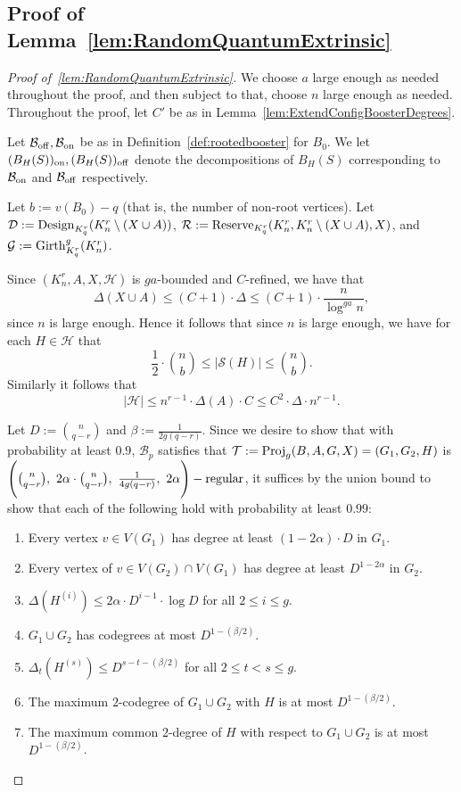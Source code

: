 \documentclass[11pt]{article}
\newcommand{\mc}[1]{\mathcal{#1}}
\newcounter{i}
\theoremstyle{plain}
\renewcommand{\theclaim}{\thetheorem.\arabic{claim}}
\newenvironment{lateproof}[1]
 {%
  \renewcommand{\theclaim}{\ref{#1}.\arabic{claim}}%
  \begin{proof}[Proof of~\cref{#1}]%
 }
 {\end{proof}}
\theoremstyle{plain} %
\theoremstyle{definition}
\newcommand{\LP}[1]{\textcolor{Red}{ $\blacktriangleright$\ {\sf LP: #1}\
  $\blacktriangleleft$ }}
\begin{document}
\subsection{Proof of Lemma~\ref{lem:RandomQuantumExtrinsic}}

\begin{lateproof}{lem:RandomQuantumExtrinsic}
We choose $a$ large enough as needed throughout the proof, and then subject to that, choose $n$ large enough as needed. Throughout the proof, let $C'$ be as in Lemma~\ref{lem:ExtendConfigBoosterDegrees}.

Let $\mathcal{B}_{{\rm off}}, \mathcal{B}_{{\rm on}}$ be as in Definition~\ref{def:rootedbooster} for $B_0$. We let $(B_H(S))_{\rm on}, (B_H(S))_{\rm off}$ denote the decompositions of $B_H(S)$ corresponding to $\mathcal{B}_{\rm on}$ and $\mathcal{B}_{\rm off}$ respectively. 

Let $b:= v(B_0)-q$ (that is, the number of non-root vertices). Let $\mc{D}:= {\rm Design}_{K_q^r}(K_n^r\setminus (X\cup A))$, $\mc{R}:= {\rm Reserve}_{K_q^r}(K_n^r, K_n^r\setminus (X\cup A), X)$, and $\mc{G}:= {\rm Girth}_{K_q^r}^g(K_n^r)$. 

Since $(K_n^r,A,X,\mc{H})$ is $ga$-bounded and $C$-refined, we have that $$\Delta(X\cup A)\le (C+1)\cdot \Delta \le (C+1)\cdot \frac{n}{\log^{ga} n},$$
since $n$ is large enough. Hence it follows that since $n$ is large enough, we have for each $H\in \mc{H}$ that
$$\frac{1}{2}\cdot \binom{n}{b} \le |\mathcal{S}(H)| \le \binom{n}{b}.$$ %
Similarly it follows that $$|\mathcal{H}| \le n^{r-1}\cdot \Delta(A) \cdot C \le C^2\cdot \Delta \cdot n^{r-1}.$$

Let $D:= \binom{n}{q-r}$ and $\beta:= \frac{1}{2g(q-r)}$. Since we desire to show that with probability at least $0.9$, $\mc{B}_p$ satisfies that $\mc{T}:= {\rm Proj}_g(B,A,G,X) = (G_1,G_2,H)$ is $\Bigg(\binom{n}{q-r},~2\alpha \cdot \binom{n}{q-r},~\frac{1}{4g(q-r)},~2\alpha\Bigg)-{\rm regular}$, it suffices by the union bound to show that each of the following hold with probability at least $0.99$:
\begin{enumerate}
    \item[(1)] Every vertex $v\in V(G_1)$ has degree at least $(1-2\alpha)\cdot D$ in $G_1$.
    \item[(2)] Every vertex of $v\in V(G_2)\cap V(G_1)$ has degree at least $D^{1-2\alpha}$ in $G_2$.
    \item[(3)] $\Delta\left(H^{(i)}\right)\le 2\alpha\cdot D^{i-1}\cdot \log D$ for all $2\le i \le g$.
    \item[(4)] $G_1\cup G_2$ has codegrees at most $D^{1-(\beta/2)}$.
    \item[(5)] $\Delta_{t}\left(H^{(s)}\right)\le D^{s-t-(\beta/2)}$ for all $2\le t < s \le g$.
    \item[(6)] The maximum $2$-codegree of $G_1\cup G_2$ with $H$ is at most $D^{1-(\beta/2)}$.
    \item[(7)] The maximum common $2$-degree of $H$ with respect to $G_1\cup G_2$ is at most $D^{1-(\beta/2)}$.
\end{enumerate}


\end{lateproof}
\end{document}
